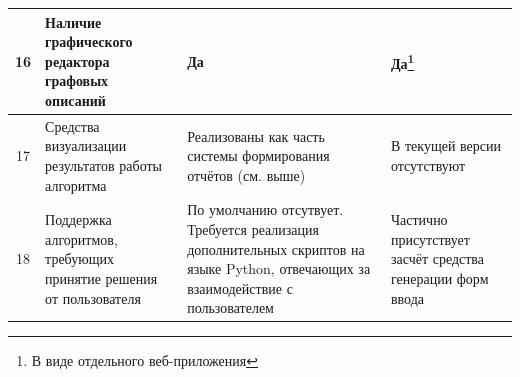 \begin{landscape}
\begin{longtable}{|c|p{}|p{}|p{}|}
    \hline
    16         & Наличие графического редактора графовых описаний                                           & Да                                                                                                                                                                                                                                                                                                                                                                                                                                                                                                                                                                                                                                                                & Да\footnote{В виде отдельного веб-приложения}                                                                                                                                                                                                                                     \\
    \hline
    17         & Средства визуализации результатов работы алгоритма                                         & Реализованы как часть системы формирования отчётов (см. выше)                                                                                                                                                                                                                                                                                                                                                                                                                                                                                                                                                                                                     & В текущей версии отсутствуют                                                                                                                                                                                                                                                      \\
    \hline
    18         & Поддержка алгоритмов, требующих принятие решения от пользователя                           & По умолчанию отсутвует. Требуется реализация дополнительных скриптов на языке Python, отвечающих за взаимодействие с пользователем                                                                                                                                                                                                                                                                                                                                                                                                                                                                                                                                & Частично присутствует засчёт средства генерации форм ввода\cite{SokolovPershin2017}                                                                                                                                                                                               \\

\end{longtable}
\end{landscape}
